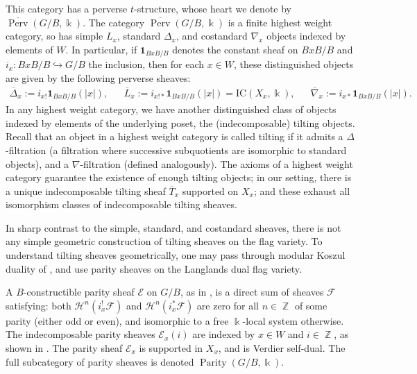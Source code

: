 \documentclass[11pt]{article}
\DeclareMathOperator{\Perv}{Perv}
\DeclareMathOperator{\Parity}{Parity}
\DeclareMathOperator{\Z}{\mathbb{Z}}
\theoremstyle{remark}
\theoremstyle{definition}
\begin{document}
	This category has a perverse $t$-structure, whose heart we denote by $\overline{\Perv}(G/B , \Bbbk)$. 
	The category $\overline{\Perv}(G/B ,\Bbbk)$ is a finite highest weight category, so has simple $L_x$, standard $\Delta_x$, and costandard $\nabla_x$ objects indexed by elements of $W$. In particular, if $\mathbf{1}_{BxB/B}$ denotes the constant sheaf on $BxB/B$ and $i_x: BxB/B \hookrightarrow G/B$ the inclusion, then for each $x \in W$, these distinguished objects are given by the following perverse sheaves:  
	\begin{align*}
		\overline{\Delta}_x := i_{x!} \mathbf{1}_{BxB/B} (|x|), 
        &&
        \overline{L}_x := i_{x!*} \mathbf{1}_{BxB/B} (|x|)=\text{IC}(X_x,\Bbbk),
		&&
		\overline{\nabla}_x := i_{x*} \mathbf{1}_{BxB/B} (|x|).
	\end{align*}
    In any highest weight category, we have another distinguished class of objects indexed by elements of the underlying poset, the (indecomposable) tilting objects. 
    Recall that an object in a highest weight category is called tilting if it admits a $\Delta$-filtration (a filtration where successive subquotients are isomorphic to standard objects), and a  $\nabla$-filtration (defined analogously). 
    The axioms of a highest weight category guarantee the existence of enough tilting objects; in our setting, there is a unique indecomposable tilting sheaf $\overline{T}_x$ supported on $X_x$; and these exhaust all isomorphism classes of indecomposable tilting sheaves. 
    \\
    \par 
	In sharp contrast to the simple, standard, and costandard sheaves, there is not any simple geometric construction of tilting sheaves on the flag variety.
	To understand tilting sheaves geometrically, one may pass through modular Koszul duality of \cite{AR16, AMRW19}, and use parity sheaves on the Langlands dual flag variety.
    \\
	\par 
	A $B$-constructible parity sheaf $\mathcal{E}$ on $G/B$, as in \cite{JMW14}, is a direct sum of sheaves $\mathcal{F}$ satisfying: both $\mathcal{H}^n(i_x^!\mathcal{F})$ and $\mathcal{H}^n(i_x^*\mathcal{F})$ are zero for all $n \in \Z$ of some parity (either odd or even), and isomorphic to a free $\Bbbk$-local system otherwise.
	The indecomposable parity sheaves $\mathscr{E}_x(i)$ are indexed by $x\in W$ and $i \in \Z$, as
    shown in \cite[\S4.1]{JMW14}. 
    The parity sheaf $\mathscr{E}_x$ is supported in $X_x$, and is Verdier self-dual. 
     The full subcategory of parity sheaves is denoted $\Parity(G/B, \Bbbk)$.
\end{document}
